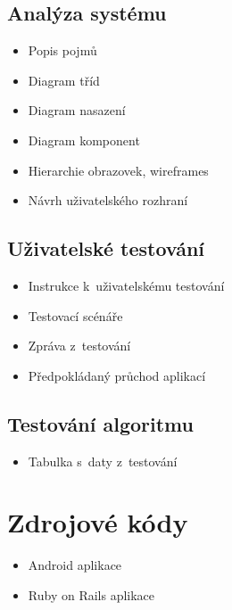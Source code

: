 \documentclass[twoside]{ctuthesis}
\begin{document}
\section{Analýza systému}\label{app:analysis}
\begin{itemize}
	\item Popis pojmů
	\item Diagram tříd
	\item Diagram nasazení
	\item Diagram komponent
	\item Hierarchie obrazovek, wireframes
	\item Návrh uživatelského rozhraní
\end{itemize}

\section{Uživatelské testování}\label{app:user-testing}

\begin{itemize}
	\item Instrukce k~uživatelskému testování
	\item Testovací scénáře
	\item Zpráva z~testování
	\item Předpokládaný průchod aplikací
\end{itemize}

\section{Testování algoritmu}\label{app:algo-testing}

\begin{itemize}
	\item Tabulka s~daty z~testování
\end{itemize}

\chapter{Zdrojové kódy}

\begin{itemize}
	\item Android aplikace
	\item Ruby on Rails aplikace
\end{itemize}
\end{document}
